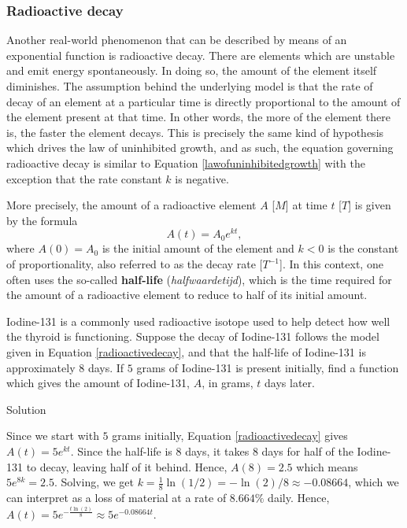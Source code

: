 \subsubsection{Radioactive decay}
 Another real-world phenomenon that can be described by means of an exponential function is radioactive decay.  There are elements which are unstable and emit energy spontaneously.  In doing so, the amount of the element itself diminishes.  The assumption behind the underlying model is that the rate of decay of an element at a particular time is directly proportional to the amount of the element present at that time.  In other words, the more of the element there is, the faster the element decays.  This is precisely the same kind of hypothesis which drives the law of uninhibited growth, and as such, the equation governing radioactive decay is similar to Equation \eqref{lawofuninhibitedgrowth} with the exception that the rate constant $k$ is negative.

More precisely, the amount of a radioactive element $A$ [$M$] at time $t$ [$T$] is given by the formula  
\begin{equation}
A(t) = A_{0}e^{kt},
\label{radioactivedecay}
\end{equation}
where $A(0) = A_0$ is the initial amount of the element and  $k<0$ is the constant of proportionality, also referred to as the decay rate [$T^{-1}$]. In this context, one often uses the so-called \textbf{half-life} (\textit{halfwaardetijd}), which is the time required for the amount of a radioactive element to reduce to half of its initial amount.

\begin{example}
Iodine-131 is a commonly used radioactive isotope used to help detect how well the thyroid is functioning.  Suppose the decay of Iodine-131 follows the model given in Equation \eqref{radioactivedecay}, and that the  half-life of Iodine-131 is approximately $8$ days.  If $5$ grams of Iodine-131 is present initially, find a function which gives the amount of Iodine-131, $A$, in grams, $t$ days later.

Solution 

 Since we start with $5$ grams initially, Equation \eqref{radioactivedecay} gives $A(t) = 5e^{kt}$.  Since the half-life is $8$ days, it takes $8$ days for half of the Iodine-131 to decay, leaving half of it behind.  Hence, $A(8) = 2.5$ which means $5e^{8k} = 2.5$.  Solving, we get $k = \frac{1}{8} \ln\left(1/2\right) = -\ln(2)/8 \approx -0.08664$, which we can interpret as a loss of material at a rate of $8.664 \%$ daily.  Hence, $A(t) = 5 e^{-\frac{t\ln(2)}{8}} \approx 5 e^{-0.08664t}$. 

\end{example}

